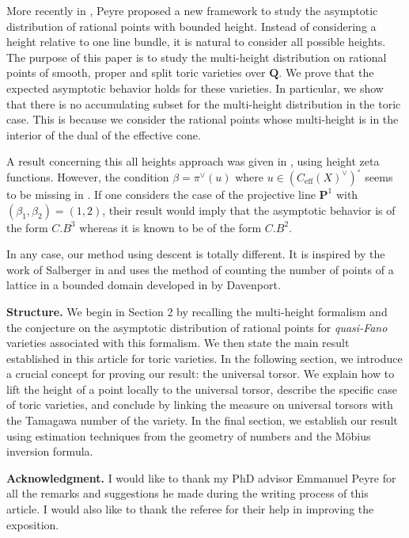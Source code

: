 \documentclass{proc-l}
\newcommand{\Proj}{\mathbf{P}}
\newcommand{\Q}{\mathbf{Q}}
\DeclareMathOperator{\eff}{eff}
\theoremstyle{definition}
\theoremstyle{remark}
\numberwithin{equation}{section}
\begin{document}
More recently in \cite{Peyre_beyond_height}, Peyre proposed a new framework to study the asymptotic distribution of rational points with bounded height. Instead of considering a height relative to one line bundle, it is natural to consider all possible heights. The purpose of this paper is to study the multi-height distribution on rational points of smooth, proper and split toric varieties over $\Q$. We prove that the expected asymptotic behavior holds for these varieties. In particular, we show that there is no accumulating subset for the multi-height distribution in the toric case. This is because we consider the rational points whose multi-height is in the interior of the dual of the effective cone.

A result concerning this all heights approach was given in \cite{demirhan2022distribution}, using height zeta functions. However, the condition $\beta = \pi^{\vee}(u)$ where $u \in (C_{\eff}(X)^{\vee})^{\circ}$ seems to be missing in \cite[theorem 1.1]{demirhan2022distribution}. If one considers the case of the projective line $\Proj^1$ with $(\beta_1,\beta_2) = (1,2)$, their result would imply that the asymptotic behavior is of the form $C.B^3$ whereas it is known to be of the form $C.B^2$.

In any case, our method using descent is totally different. It is inspired by the work of Salberger in \cite{salberger_torsor} and uses the method of counting the number of points of a lattice in a bounded domain developed in \cite{davenport_geometry_numbers} by Davenport.

\textbf{Structure. } We begin in Section 2 by recalling the multi-height formalism and the conjecture on the asymptotic distribution of rational points for \textit{quasi-Fano} varieties associated with this formalism. We then state the main result established in this article for toric varieties. In the following section, we introduce a crucial concept for proving our result: the universal torsor. We explain how to lift the height of a point locally to the universal torsor, describe the specific case of toric varieties, and conclude by linking the measure on universal torsors with the Tamagawa number of the variety. In the final section, we establish our result using estimation techniques from the geometry of numbers and the Möbius inversion formula.

\textbf{Acknowledgment. }I would like to thank my PhD advisor Emmanuel Peyre for all the remarks and suggestions he made during the writing process of this article. I would also like to thank the referee for their help in improving the exposition.
\end{document}
